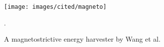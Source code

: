 \begin{figure}[htb]
\begin{center}
\texttt{[image: images/cited/magneto]}
\end{center}
\caption{A magnetostrictive energy harvester by Wang et al. \cite{Wang2006}}.
\label{magneto}
\end{figure}

